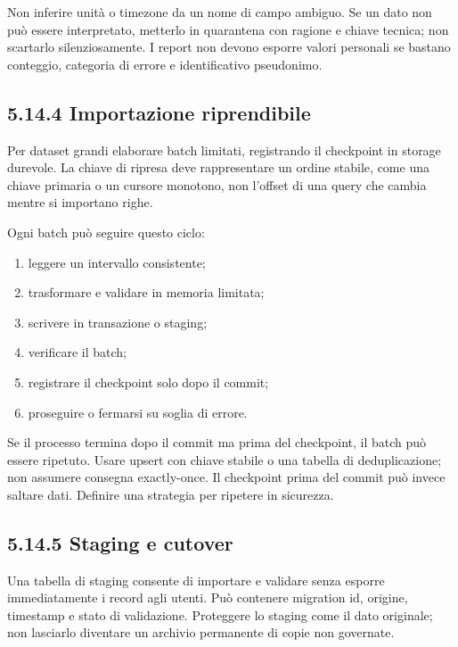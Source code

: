 \documentclass[
  italian,
  10pt,
]{book}
\providecommand{\tightlist}{%
  \setlength{\itemsep}{0pt}\setlength{\parskip}{0pt}}
\begin{document}
Non inferire unità o timezone da un nome di campo ambiguo. Se un dato
non può essere interpretato, metterlo in quarantena con ragione e chiave
tecnica; non scartarlo silenziosamente. I report non devono esporre
valori personali se bastano conteggio, categoria di errore e
identificativo pseudonimo.

\subsection{5.14.4 Importazione
riprendibile}\label{importazione-riprendibile}

Per dataset grandi elaborare batch limitati, registrando il checkpoint
in storage durevole. La chiave di ripresa deve rappresentare un ordine
stabile, come una chiave primaria o un cursore monotono, non l'offset di
una query che cambia mentre si importano righe.

Ogni batch può seguire questo ciclo:

\begin{enumerate}
\def\labelenumi{\arabic{enumi}.}
\tightlist
\item
  leggere un intervallo consistente;
\item
  trasformare e validare in memoria limitata;
\item
  scrivere in transazione o staging;
\item
  verificare il batch;
\item
  registrare il checkpoint solo dopo il commit;
\item
  proseguire o fermarsi su soglia di errore.
\end{enumerate}

Se il processo termina dopo il commit ma prima del checkpoint, il batch
può essere ripetuto. Usare upsert con chiave stabile o una tabella di
deduplicazione; non assumere consegna exactly-once. Il checkpoint prima
del commit può invece saltare dati. Definire una strategia per ripetere
in sicurezza.

\subsection{5.14.5 Staging e cutover}\label{staging-e-cutover}

Una tabella di staging consente di importare e validare senza esporre
immediatamente i record agli utenti. Può contenere migration id,
origine, timestamp e stato di validazione. Proteggere lo staging come il
dato originale; non lasciarlo diventare un archivio permanente di copie
non governate.
\end{document}
